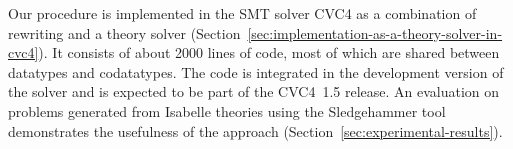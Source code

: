 
Our procedure is implemented in the SMT solver CVC4 \cite{barrett-et-al-2011} as a combination
of rewriting and a theory solver (Section~\ref{sec:implementation-as-a-theory-solver-in-cvc4}).
It consists of about 2000 lines of \cpp{} code, %
most of which are shared between datatypes and codatatypes. The code is
integrated in the development version of the solver and is expected to be part
of the CVC4~1.5 release.
%
An evaluation on %
problems generated from Isabelle theories using the Sledgehammer tool \cite{blanchette-et-al-2013-smt}
demonstrates the usefulness of the approach (Section~\ref{sec:experimental-results}).



%










